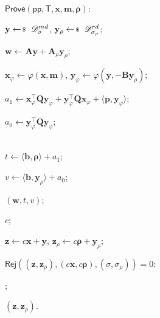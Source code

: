 \documentclass[../../book.tex]{subfiles}
\begin{document}
\begin{algoproto}[ht]
    \small
    \centering
    \begin{mdframed}[linecolor=black, linewidth=1pt,
                     skipabove=10pt, skipbelow=10pt,
                     innerleftmargin=5pt, innerrightmargin=5pt]
        \begin{minipage}[t]{0.5\linewidth}
            \colorbox{oc-blue-1}{$\mathsf{Prove}(\mathsf{pp}, \mathsf{T}, \mathbf{x}, \mathbf{m}, \boldsymbol{\rho})$:}
            \begin{algoen}
                \item $\mathbf{y} \leftarrowS \dgaussian_{\sigma}^{md}$, $\mathbf{y}_{\rho} \leftarrowS \dgaussian_{\sigma_{\rho}}^{rd}$;
                \item $\mathbf{w} \gets \mathbf{A}\mathbf{y} + \mathbf{A}_{\rho}\mathbf{y}_{\rho}$;
                \item $\mathbf{x}_{\varphi} \gets \varphi(\mathbf{x}, \mathbf{m})$, $\mathbf{y}_{\varphi} \gets \varphi(\mathbf{y}, -\mathbf{B}\mathbf{y}_{\rho})$;
                \item $a_1 \gets \mathbf{x}_{\varphi}^{\top}\mathbf{Q}\mathbf{y}_{\varphi} + \mathbf{y}_{\varphi}^{\top}\mathbf{Q}\mathbf{x}_{\varphi} + \langle \mathbf{p}, \mathbf{y}_{\varphi} \rangle$;
                \item $a_0 \gets \mathbf{y}_{\varphi}^{\top}\mathbf{Q}\mathbf{y}_{\varphi}$;
                \item {} \\ $t \gets \langle \mathbf{b}, \boldsymbol{\rho} \rangle + a_1$;
                \item $v \gets \langle \mathbf{b}, \mathbf{y}_{\rho} \rangle + a_0$;
                \item {} $(\mathbf{w}, t, v)$;
                \item {} $c$;
                \item $\mathbf{z} \gets c\mathbf{x} + \mathbf{y}$, $\mathbf{z}_{\rho} \gets c\boldsymbol{\rho} + \mathbf{y}_{\rho}$;
                \item {} $\mathsf{Rej}((\mathbf{z},\mathbf{z}_{\rho}), (c\mathbf{x},c\boldsymbol{\rho}), (\sigma,\sigma_{\rho})) = 0$: 
                \item \hspace{5px} ;
                \item {} $(\mathbf{z}, \mathbf{z}_{\rho})$.
            \end{algoen}

\end{minipage}
\end{mdframed}
\end{algoproto}
\end{document}
